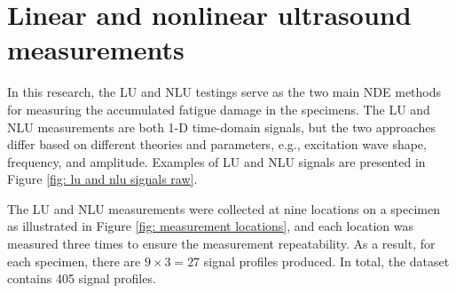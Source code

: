 \section{Linear and nonlinear ultrasound measurements}
In this research, the LU and NLU testings serve as the two main NDE methods for measuring the accumulated fatigue damage in the specimens. 
The LU and NLU measurements are both 1-D time-domain signals, but the two approaches differ based on different theories and parameters, e.g., excitation wave shape, frequency, and amplitude. Examples of LU and NLU signals are presented in Figure \ref{fig: lu and nlu signals raw}.

The LU and NLU measurements were collected at nine locations on a specimen as illustrated in Figure \ref{fig: measurement locations}, and each location was measured three times to ensure the measurement repeatability. As a result, for each specimen, there are $9 \times 3 = 27$ signal profiles produced. In total, the dataset contains 405 signal profiles.


